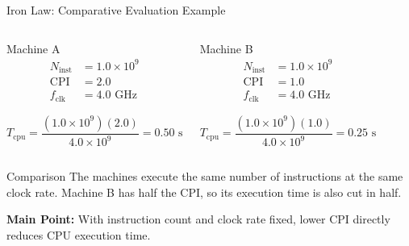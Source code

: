 \documentclass[aspectratio=169,11pt,t]{beamer}
\begin{document}
\begin{frame}{Iron Law: Comparative Evaluation Example}

\vspace{-0.15cm}

\begin{columns}[T,onlytextwidth]

\begin{block}{Machine A}
\[
\begin{aligned}
N_{\mathrm{inst}} &= 1.0\times10^9 \\
\mathrm{CPI} &= 2.0 \\
f_{\mathrm{clk}} &= 4.0\text{ GHz}
\end{aligned}
\]

\[
T_{\mathrm{cpu}}
=
\frac{(1.0\times10^9)(2.0)}
     {4.0\times10^9}
=
0.50\text{ s}
\]
\end{block}

\begin{block}{Machine B}
\[
\begin{aligned}
N_{\mathrm{inst}} &= 1.0\times10^9 \\
\mathrm{CPI} &= 1.0 \\
f_{\mathrm{clk}} &= 4.0\text{ GHz}
\end{aligned}
\]

\[
T_{\mathrm{cpu}}
=
\frac{(1.0\times10^9)(1.0)}
     {4.0\times10^9}
=
0.25\text{ s}
\]
\end{block}

\end{columns}

\vspace{0.1cm}

\begin{block}{Comparison}
The machines execute the same number of instructions at the same clock rate.
Machine B has half the CPI, so its execution time is also cut in half.

\vspace{0.1cm}

\textbf{Main Point:} With instruction count and clock rate fixed,
lower CPI directly reduces CPU execution time.
\end{block}

\end{frame}


\end{document}
